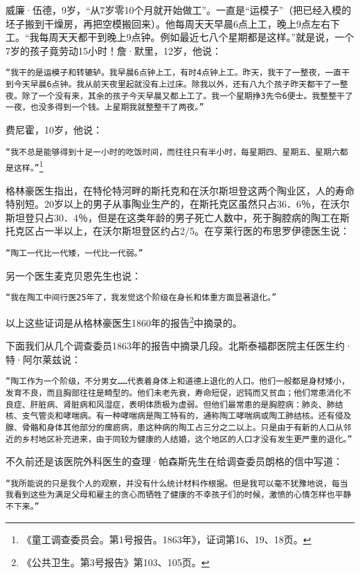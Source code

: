\documentclass{ctexbook}
\begin{document}
    威廉·伍德，9岁，“从7岁零10个月就开始做工”。一直是“运模子”（把已经入模的坯子搬到干燥房，再把空模搬回来）。他每周天天早晨6点上工，晚上9点左右下工。“我每周天天都干到晚上9点钟。例如最近七八个星期都是这样。”就是说，一个7岁的孩子竟劳动15小时！詹·默里，12岁，他说：

    \texttt{“我干的是运模子和转辘轳。我早晨6点钟上工，有时4点钟上工。昨天，我干了一整夜，一直干到今天早晨6点钟。我从前天夜里起就没有上过床。除我以外，还有八九个孩子昨天都干了一整夜。除了一个没有来，其余的孩子今天早晨又都上工了。我一个星期挣3先令6便士。我整整干了一夜，也没多得到一个钱。上星期我就整整干了两夜。”}

    费尼霍，10岁，他说：

    \texttt{“我不总是能够得到十足一小时的吃饭时间，而往往只有半小时，每星期四、星期五、星期六都是这样。”}\footnote{《童工调查委员会。第1号报告。1863年》，证词第16、19、18页。}

    格林豪医生指出，在特伦特河畔的斯托克和在沃尔斯坦登这两个陶业区，人的寿命特别短。20岁以上的男子从事陶业生产的，在斯托克区虽然只占36．6％，在沃尔斯坦登只占30．4％，但是在这类年龄的男子死亡人数中，死于胸腔病的陶工在斯托克区占一半以上，在沃尔斯坦登区约占2/5。在亨莱行医的布思罗伊德医生说：

    \texttt{“陶工一代比一代矮，一代比一代弱。”}

    另一个医生麦克贝恩先生也说：

    \texttt{“我在陶工中间行医25年了，我发觉这个阶级在身长和体重方面显著退化。”}

    以上这些证词是从格林豪医生1860年的报告\footnote{《公共卫生。第3号报告》第103、105页。}中摘录的。

    下面我们从几个调查委员1863年的报告中摘录几段。北斯泰福郡医院主任医生约·特·阿尔莱兹说：

    \texttt{“陶工作为一个阶级，不分男女……代表着身体上和道德上退化的人口。他们一般都是身材矮小，发育不良，而且胸部往往是畸型的。他们未老先衰，寿命短促，迟钝而又贫血；他们常患消化不良症、肝脏病、肾脏病和风湿症，表明体质极为虚弱。但他们最常患的是胸腔病：肺炎、肺结核、支气管炎和哮喘病。有一种哮喘病是陶工特有的，通称陶工哮喘病或陶工肺结核。还有侵及腺、骨骼和身体其他部分的瘰疬病，患这种病的陶工占三分之二以上。只是由于有新的人口从邻近的乡村地区补充进来，由于同较为健康的人结婚，这个地区的人口才没有发生更严重的退化。”}

    不久前还是该医院外科医生的查理·帕森斯先生在给调查委员朗格的信中写道：

    \texttt{“我所能说的只是我个人的观察，并没有什么统计材料作根据。但是我可以毫不犹豫地说，每当我看到这些为满足父母和雇主的贪心而牺牲了健康的不幸孩子们的时候，激愤的心情怎样也平静不下来。”}
\end{document}
